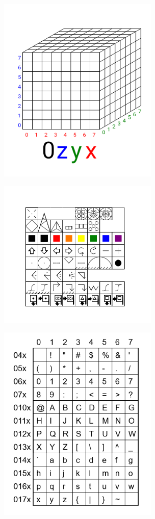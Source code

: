 \documentclass[11pt]{article}
\begin{document}
\includegraphics[width=3in]{image23.png}





\includegraphics[width=3in]{image24.png}





\includegraphics[width=3in]{image25.png}
\end{document}

